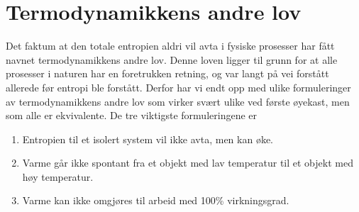  \section{Termodynamikkens andre lov}
 Det faktum at den totale entropien aldri vil avta i fysiske prosesser har fått navnet termodynamikkens andre lov. Denne loven ligger til grunn for at alle prosesser i naturen har en foretrukken retning, og var langt på vei forstått allerede før entropi ble forstått. Derfor har vi endt opp med ulike formuleringer av termodynamikkens andre lov som virker svært ulike ved første øyekast, men som alle er ekvivalente. De tre viktigste formuleringene er
 \begin{enumerate}
 \item
Entropien til et isolert system vil ikke avta, men kan øke.
\item
Varme går ikke spontant fra et objekt med lav temperatur til et objekt med høy temperatur.
\item
Varme kan ikke omgjøres til arbeid med 100\% virkningsgrad.
\end{enumerate}